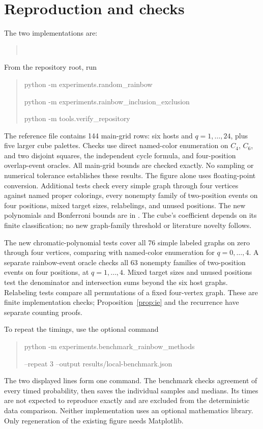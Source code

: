 \documentclass[10pt,letterpaper]{article}
\begin{document}
\section*{Reproduction and checks}
The two implementations are:
\begin{quote}\small
{}\\
\end{quote}
From the repository root, run
\begin{quote}\small\ttfamily
python -m experiments.random\_rainbow\par
python -m experiments.rainbow\_inclusion\_exclusion\par
python -m tools.verify\_repository
\end{quote}
The reference file  contains 144
main-grid rows: six hosts and $q=1,\ldots,24$, plus five larger cube palettes.
Checks use direct named-color enumeration on $C_4$, $C_6$, and two disjoint
squares, the independent cycle formula, and four-position overlap-event
oracles. All main-grid bounds are checked exactly. No sampling or numerical
tolerance establishes these results. The figure alone uses floating-point
conversion. Additional tests check every simple graph through four vertices
against named proper colorings, every nonempty family of two-position events
on four positions, mixed target sizes, relabelings, and unused positions.
The new polynomials and Bonferroni bounds are in
.
The cube's coefficient depends on its finite classification;
no new graph-family threshold or literature novelty follows.

The new chromatic-polynomial tests cover all 76 simple labeled graphs on
zero through four vertices, comparing with named-color enumeration for
$q=0,\ldots,4$. A separate rainbow-event oracle checks all 63 nonempty
families of two-position events on four positions, at $q=1,\ldots,4$.
Mixed target sizes and unused positions test the denominator and intersection
sums beyond the six host graphs. Relabeling tests compare all permutations
of a fixed four-vertex graph. These are finite implementation checks;
Proposition~\ref{prop:ie} and the recurrence have separate counting proofs.

To repeat the timings, use the optional command
\begin{quote}\small\ttfamily
python -m experiments.benchmark\_rainbow\_methods\par
\hspace*{1em}--repeat 3 --output results/local-benchmark.json
\end{quote}
The two displayed lines form one command. The benchmark checks agreement
of every timed probability, then saves the individual samples and medians.
Its times are not expected to reproduce exactly and are excluded from the
deterministic data comparison. Neither implementation uses an optional
mathematics library. Only regeneration of the existing figure needs Matplotlib.
\end{document}
